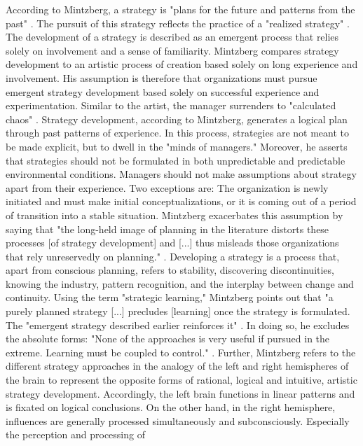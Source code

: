 \documentclass[a4paper,12pt]{article}
\begin{document}
According to Mintzberg, a strategy is "plans for the future and patterns from
the past" \cite[p. 41]{Mintzberg}. The pursuit of this strategy reflects the
practice of a "realized strategy" \cite[p. 41]{Mintzberg}. The development of
a strategy is described as an emergent process that relies solely on
involvement and a sense of familiarity. Mintzberg compares strategy
development to an artistic process of creation based solely on long experience
and involvement. His assumption is therefore that organizations must pursue
emergent strategy development based solely on successful experience and
experimentation. Similar to the artist, the manager surrenders to "calculated
chaos" \cite[p. 40]{Mintzberg}. Strategy development, according to Mintzberg,
generates a logical plan through past patterns of experience. In this process,
strategies are not meant to be made explicit, but to dwell in the "minds of
managers." Moreover, he asserts that strategies should not be formulated in
both unpredictable and predictable environmental conditions. Managers should
not make assumptions about strategy apart from their experience. Two
exceptions are: The organization is newly initiated and must make initial
conceptualizations, or it is coming out of a period of transition into a
stable situation. Mintzberg exacerbates this assumption by saying that "the
long-held image of planning in the literature distorts these processes [of
  strategy development] and [...] thus misleads those organizations that rely
unreservedly on planning." \cite[p. 42]{Mintzberg}. Developing a strategy is a
process that, apart from conscious planning, refers to stability, discovering
discontinuities, knowing the industry, pattern recognition, and the interplay
between change and continuity. Using the term "strategic learning," Mintzberg
points out that "a purely planned strategy [...] precludes [learning] once the
strategy is formulated. The "emergent strategy described earlier reinforces
it" \cite[p. 45]{Mintzberg}. In doing so, he excludes the absolute forms:
"None of the approaches is very useful if pursued in the extreme. Learning
must be coupled to control." \cite[p. 45]{Mintzberg}. Further, Mintzberg
refers to the different strategy approaches in the analogy of the left and
right hemispheres of the brain to represent the opposite forms of rational,
logical and intuitive, artistic strategy development. Accordingly, the left
brain functions in linear patterns and is fixated on logical conclusions. On
the other hand, in the right hemisphere, influences are generally processed
simultaneously and subconsciously. Especially the perception and processing of
\end{document}
